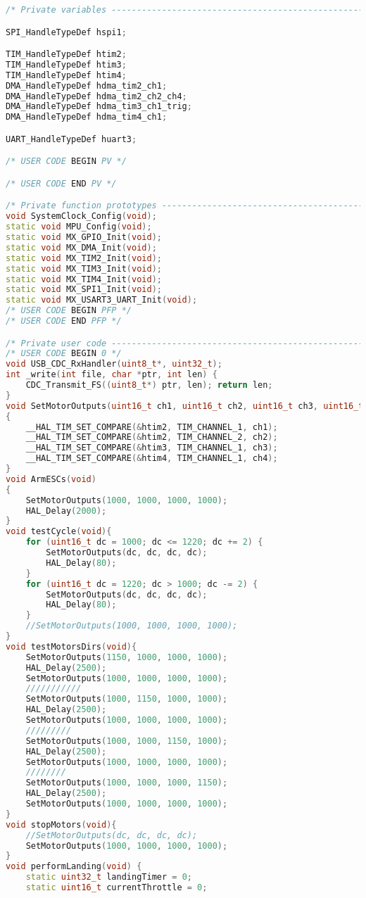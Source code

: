 \begin{lstlisting}[language=C++]
/* Private variables ---------------------------------------------------------*/

SPI_HandleTypeDef hspi1;

TIM_HandleTypeDef htim2;
TIM_HandleTypeDef htim3;
TIM_HandleTypeDef htim4;
DMA_HandleTypeDef hdma_tim2_ch1;
DMA_HandleTypeDef hdma_tim2_ch2_ch4;
DMA_HandleTypeDef hdma_tim3_ch1_trig;
DMA_HandleTypeDef hdma_tim4_ch1;

UART_HandleTypeDef huart3;

/* USER CODE BEGIN PV */

/* USER CODE END PV */

/* Private function prototypes -----------------------------------------------*/
void SystemClock_Config(void);
static void MPU_Config(void);
static void MX_GPIO_Init(void);
static void MX_DMA_Init(void);
static void MX_TIM2_Init(void);
static void MX_TIM3_Init(void);
static void MX_TIM4_Init(void);
static void MX_SPI1_Init(void);
static void MX_USART3_UART_Init(void);
/* USER CODE BEGIN PFP */
/* USER CODE END PFP */

/* Private user code ---------------------------------------------------------*/
/* USER CODE BEGIN 0 */
void USB_CDC_RxHandler(uint8_t*, uint32_t);
int _write(int file, char *ptr, int len) {
    CDC_Transmit_FS((uint8_t*) ptr, len); return len;
}
void SetMotorOutputs(uint16_t ch1, uint16_t ch2, uint16_t ch3, uint16_t ch4)
{
    __HAL_TIM_SET_COMPARE(&htim2, TIM_CHANNEL_1, ch1);
    __HAL_TIM_SET_COMPARE(&htim2, TIM_CHANNEL_2, ch2);
    __HAL_TIM_SET_COMPARE(&htim3, TIM_CHANNEL_1, ch3);
    __HAL_TIM_SET_COMPARE(&htim4, TIM_CHANNEL_1, ch4);
}
void ArmESCs(void)
{
    SetMotorOutputs(1000, 1000, 1000, 1000);
    HAL_Delay(2000);
}
void testCycle(void){
    for (uint16_t dc = 1000; dc <= 1220; dc += 2) {
        SetMotorOutputs(dc, dc, dc, dc);
        HAL_Delay(80);
    }
    for (uint16_t dc = 1220; dc > 1000; dc -= 2) {
        SetMotorOutputs(dc, dc, dc, dc);
        HAL_Delay(80);
    }
    //SetMotorOutputs(1000, 1000, 1000, 1000);
}
void testMotorsDirs(void){
    SetMotorOutputs(1150, 1000, 1000, 1000);
    HAL_Delay(2500);
    SetMotorOutputs(1000, 1000, 1000, 1000);
    ///////////
    SetMotorOutputs(1000, 1150, 1000, 1000);
    HAL_Delay(2500);
    SetMotorOutputs(1000, 1000, 1000, 1000);
    /////////
    SetMotorOutputs(1000, 1000, 1150, 1000);
    HAL_Delay(2500);
    SetMotorOutputs(1000, 1000, 1000, 1000);
    ////////
    SetMotorOutputs(1000, 1000, 1000, 1150);
    HAL_Delay(2500);
    SetMotorOutputs(1000, 1000, 1000, 1000);
}
void stopMotors(void){
    //SetMotorOutputs(dc, dc, dc, dc);
    SetMotorOutputs(1000, 1000, 1000, 1000);
}
void performLanding(void) {
    static uint32_t landingTimer = 0;
    static uint16_t currentThrottle = 0;


\end{lstlisting}
